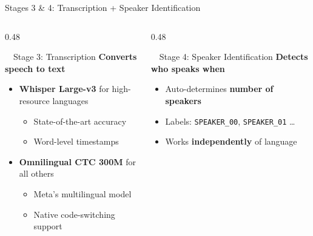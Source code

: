 \documentclass[aspectratio=169, 11pt]{beamer}
\begin{document}
\begin{frame}{Stages 3 \& 4: Transcription + Speaker Identification}
    \begin{columns}[T]
        \begin{column}{0.48\textwidth}
            \begin{block}{\faMicrophone\ \ Stage 3: Transcription}
                \scriptsize
                \textbf{Converts speech to text}
                \vspace{0.2em}
                \begin{itemize}
                    \item \textbf{Whisper Large-v3} for high-resource languages
                        \begin{itemize}
                            \scriptsize
                            \item State-of-the-art accuracy
                            \item Word-level timestamps
                        \end{itemize}
                    \item \textbf{Omnilingual CTC 300M} for all others
                        \begin{itemize}
                            \scriptsize
                            \item Meta's multilingual model
                            \item Native code-switching support
                        \end{itemize}
                \end{itemize}
            \end{block}
        \end{column}
        \begin{column}{0.48\textwidth}
            \begin{block}{\faUsers\ \ Stage 4: Speaker Identification}
                \scriptsize
                \textbf{Detects who speaks when}
                \vspace{0.2em}
                \begin{itemize}
                    \item Auto-determines \textbf{number of speakers}
                    \item Labels: {\small\texttt{SPEAKER\_00}, \texttt{SPEAKER\_01}} \ldots
                    \item Works \textbf{independently} of language

\end{itemize}
\end{block}
\end{column}
\end{columns}
\end{frame}
\end{document}
